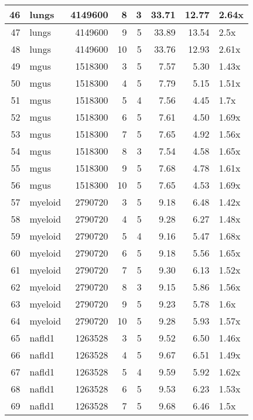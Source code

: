 \begin{table}[ht]
\begin{tabular}{rlrrrrrl}
   \hline
46 & lungs & 4149600 &   8 &   3 & 33.71 & 12.77 & 2.64x \\ 
   \hline
47 & lungs & 4149600 &   9 &   5 & 33.89 & 13.54 & 2.5x \\ 
   \hline
48 & lungs & 4149600 &  10 &   5 & 33.76 & 12.93 & 2.61x \\ 
   \hline
49 & mgus & 1518300 &   3 &   5 & 7.57 & 5.30 & 1.43x \\ 
   \hline
50 & mgus & 1518300 &   4 &   5 & 7.79 & 5.15 & 1.51x \\ 
   \hline
51 & mgus & 1518300 &   5 &   4 & 7.56 & 4.45 & 1.7x \\ 
   \hline
52 & mgus & 1518300 &   6 &   5 & 7.61 & 4.50 & 1.69x \\ 
   \hline
53 & mgus & 1518300 &   7 &   5 & 7.65 & 4.92 & 1.56x \\ 
   \hline
54 & mgus & 1518300 &   8 &   3 & 7.54 & 4.58 & 1.65x \\ 
   \hline
55 & mgus & 1518300 &   9 &   5 & 7.68 & 4.78 & 1.61x \\ 
   \hline
56 & mgus & 1518300 &  10 &   5 & 7.65 & 4.53 & 1.69x \\ 
   \hline
57 & myeloid & 2790720 &   3 &   5 & 9.18 & 6.48 & 1.42x \\ 
   \hline
58 & myeloid & 2790720 &   4 &   5 & 9.28 & 6.27 & 1.48x \\ 
   \hline
59 & myeloid & 2790720 &   5 &   4 & 9.16 & 5.47 & 1.68x \\ 
   \hline
60 & myeloid & 2790720 &   6 &   5 & 9.18 & 5.56 & 1.65x \\ 
   \hline
61 & myeloid & 2790720 &   7 &   5 & 9.30 & 6.13 & 1.52x \\ 
   \hline
62 & myeloid & 2790720 &   8 &   3 & 9.15 & 5.86 & 1.56x \\ 
   \hline
63 & myeloid & 2790720 &   9 &   5 & 9.23 & 5.78 & 1.6x \\ 
   \hline
64 & myeloid & 2790720 &  10 &   5 & 9.28 & 5.93 & 1.57x \\ 
   \hline
65 & nafld1 & 1263528 &   3 &   5 & 9.52 & 6.50 & 1.46x \\ 
   \hline
66 & nafld1 & 1263528 &   4 &   5 & 9.67 & 6.51 & 1.49x \\ 
   \hline
67 & nafld1 & 1263528 &   5 &   4 & 9.59 & 5.92 & 1.62x \\ 
   \hline
68 & nafld1 & 1263528 &   6 &   5 & 9.53 & 6.23 & 1.53x \\ 
   \hline
69 & nafld1 & 1263528 &   7 &   5 & 9.68 & 6.46 & 1.5x \\ 

\end{tabular}
\end{table}
